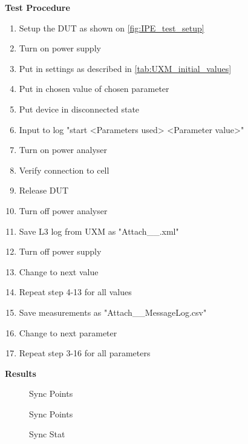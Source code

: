 \textbf{Test Procedure}\\
\begin{enumerate}
\item Setup the \gls{DUT} as shown on \autoref{fig:IPE_test_setup}
\item Turn on power supply 
\item Put in settings as described in \autoref{tab:UXM_initial_values}
\item Put in chosen value of chosen parameter
\item Put device in disconnected state 
\item Input to log "start <Parameters used> <Parameter value>"
\item Turn on power analyser
\item Verify connection to cell
\item Release DUT
\item Turn off power analyser
\item Save L3 log from UXM as "Attach\_<Parameters used>\_<Parameters value>.xml"
\item Turn off power supply
\item Change to next value
\item Repeat step 4-13 for all values
\item Save measurements as "Attach\_<Parameters used>\_MessageLog.csv"
\item Change to next parameter
\item Repeat step 3-16 for all parameters
\end{enumerate}


\textbf{Results}\\

\begin{figure}[H]
\centering
\resizebox{\textwidth}{!}{
}
\caption{Sync Points}
\label{fig:device_power_setup}
\end{figure}

\begin{minipage}{0.48\textwidth}
\begin{figure}[H]
\centering
\resizebox{\textwidth}{!}{
}
\caption{Sync Points}
\label{fig:device_power_setup}
\end{figure}
\end{minipage}
\hfill
\begin{minipage}{0.48\textwidth}
\begin{figure}[H]
\centering
\resizebox{\textwidth}{!}{
}
\caption{Sync Stat}
\label{fig:device_power_setup}
\end{figure}
\end{minipage}




